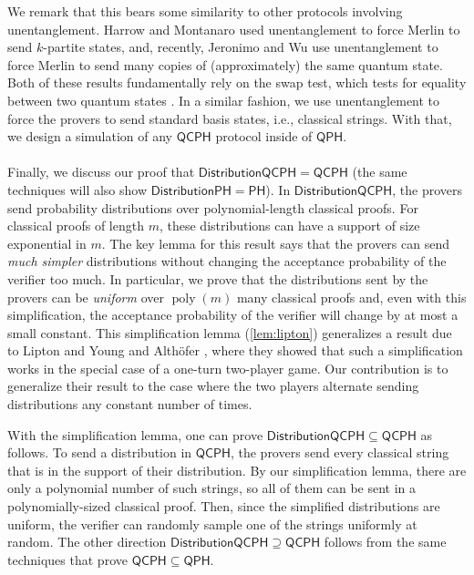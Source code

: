 \documentclass[10pt,a4paper]{article}
\theoremstyle{definition}
\DeclareMathOperator{\poly}{poly}
\newcommand{\class}[1]{\ensuremath{\mathsf{#1}}\xspace}
\newcommand{\PH}{\class{PH}}
\newcommand{\QCPH}{\class{QCPH}}
\newcommand{\QPH}{\class{QPH}}
\newcommand{\distributionPH}{\mixedPH}
\newcommand{\distributionQCPH}{\mathsf{DistributionQCPH}}
\newcommand{\mixedPH}{\class{DistributionPH}}
\begin{document}
We remark that this bears some similarity to other protocols involving unentanglement. 
Harrow and Montanaro \cite{harrow2013testing} used unentanglement to force Merlin to send $k$-partite states, and, recently, Jeronimo and Wu \cite{jeronimo2023power} use unentanglement to force Merlin to send many copies of (approximately) the same quantum state. 
Both of these results fundamentally rely on the swap test, which tests for equality between two quantum states \cite{buhrman2001quantum}. 
In a similar fashion, we use unentanglement to force the provers to send standard basis states, i.e., classical strings. 
With that, we design a simulation of any $\QCPH$ protocol inside of $\QPH$. 

\paragraph{}


Finally, we discuss our proof that $\distributionQCPH = \QCPH$ (the same techniques will also show $\distributionPH = \PH$). 
In $\distributionQCPH$, the provers send probability distributions over polynomial-length classical proofs. 
For classical proofs of length $m$, these distributions can have a support of size exponential in $m$. 
The key lemma for this result says that the provers can send \emph{much simpler} distributions without changing the acceptance probability of the verifier too much. 
In particular, we prove that the distributions sent by the provers can be \emph{uniform} over $\poly(m)$ many classical proofs and, even with this simplification, the acceptance probability of the verifier will change by at most a small constant.  
This simplification lemma (\cref{lem:lipton}) generalizes a result due to Lipton and Young \cite{lipton1994simple} and Althöfer \cite{ALTHOFER1994339}, where they showed that such a simplification works in the special case of a one-turn two-player game. 
Our contribution is to generalize their result to the case where the two players alternate sending distributions any constant number of times.


With the simplification lemma, one can prove $\distributionQCPH \subseteq \QCPH$ as follows. 
To send a distribution in $\QCPH$, the provers send every classical string that is in the support of their distribution. By our simplification lemma, there are only a polynomial number of such strings, so all of them can be sent in a polynomially-sized classical proof.  
Then, since the simplified distributions are uniform, the verifier can randomly sample one of the strings uniformly at random.
The other direction $\distributionQCPH \supseteq \QCPH$ follows from the same techniques that prove $\QCPH \subseteq \QPH$. 
\end{document}

